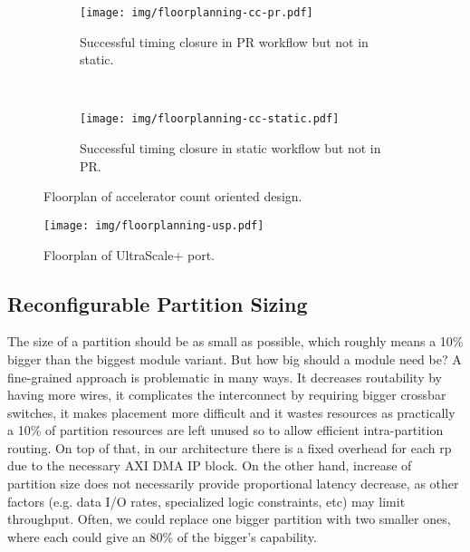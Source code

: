 \begin{figure}[htb!]
\centering
\begin{subfigure}[h]{\textwidth}
	\centering
	\texttt{[image: img/floorplanning-cc-pr.pdf]}
	\caption{Successful timing closure in PR workflow but not in static.}
\end{subfigure}
\\
\begin{subfigure}[h]{\textwidth}
	\centering
	\texttt{[image: img/floorplanning-cc-static.pdf]}
	\caption{Successful timing closure in static workflow but not in PR.}
\end{subfigure}
\caption{Floorplan of accelerator count oriented design.}
\label{fig:floorplanning-cc}
\end{figure}

\begin{figure}[htb!]
\centering
	\texttt{[image: img/floorplanning-usp.pdf]}
\caption{Floorplan of UltraScale+ port.}
\label{fig:floorplanning-usp}
\end{figure}

\subsection{Reconfigurable Partition Sizing}
\label{sec:sizing}

The size of a partition should be as small as possible, which roughly means a 10\% bigger than the biggest module variant.
But how big should a module need be? A fine-grained approach is problematic in many ways.
It decreases routability by having more wires, it complicates the interconnect
by requiring bigger crossbar switches, it makes placement more difficult and it wastes resources as practically a 10\% of
partition resources are left unused so to allow efficient intra-partition routing. On top of that, in our architecture
there is a fixed overhead for each \gls{rp} due to the necessary AXI DMA IP block. On the other hand, increase of partition
size does not necessarily provide proportional latency decrease, as other factors 
(e.g. data I/O rates, specialized logic constraints, etc) may limit throughput.
Often, we could replace one bigger partition with two smaller ones, where each could give an 80\% of the bigger's capability.


